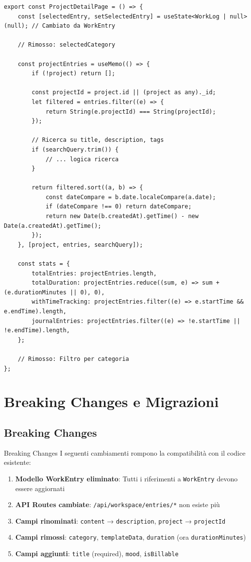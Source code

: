 \documentclass[11pt,a4paper]{article}
\begin{document}
\begin{lstlisting}[caption=ProjectDetailPage Aggiornato]
export const ProjectDetailPage = () => {
    const [selectedEntry, setSelectedEntry] = useState<WorkLog | null>(null); // Cambiato da WorkEntry
    
    // Rimosso: selectedCategory
    
    const projectEntries = useMemo(() => {
        if (!project) return [];
        
        const projectId = project.id || (project as any)._id;
        let filtered = entries.filter((e) => {
            return String(e.projectId) === String(projectId);
        });
        
        // Ricerca su title, description, tags
        if (searchQuery.trim()) {
            // ... logica ricerca
        }
        
        return filtered.sort((a, b) => {
            const dateCompare = b.date.localeCompare(a.date);
            if (dateCompare !== 0) return dateCompare;
            return new Date(b.createdAt).getTime() - new Date(a.createdAt).getTime();
        });
    }, [project, entries, searchQuery]);
    
    const stats = {
        totalEntries: projectEntries.length,
        totalDuration: projectEntries.reduce((sum, e) => sum + (e.durationMinutes || 0), 0),
        withTimeTracking: projectEntries.filter((e) => e.startTime && e.endTime).length,
        journalEntries: projectEntries.filter((e) => !e.startTime || !e.endTime).length,
    };
    
    // Rimosso: Filtro per categoria
};
\end{lstlisting}

\section{Breaking Changes e Migrazioni}

\subsection{Breaking Changes}

\begin{importantbox}{Breaking Changes}
I seguenti cambiamenti rompono la compatibilità con il codice esistente:
\begin{enumerate}
    \item \textbf{Modello WorkEntry eliminato}: Tutti i riferimenti a \texttt{WorkEntry} devono essere aggiornati
    \item \textbf{API Routes cambiate}: \texttt{/api/workspace/entries/*} non esiste più
    \item \textbf{Campi rinominati}: \texttt{content} → \texttt{description}, \texttt{project} → \texttt{projectId}
    \item \textbf{Campi rimossi}: \texttt{category}, \texttt{templateData}, \texttt{duration} (ora \texttt{durationMinutes})
    \item \textbf{Campi aggiunti}: \texttt{title} (required), \texttt{mood}, \texttt{isBillable}
\end{enumerate}
\end{importantbox}
\end{document}
